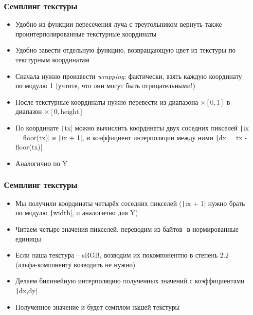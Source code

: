 \documentclass[10pt]{beamer}
\begin{document}
\begin{frame}
\frametitle{Семплинг текстуры}
\begin{itemize}
\item Удобно из функции пересечения луча с треугольником вернуть также проинтерполированные текстурные координаты
\pause
\item Удобно завести отдельную функцию, возвращающую цвет из текстуры по текстурным координатам
\pause
\item Сначала нужно произвести \textit{wrapping}: фактически, взять каждую координату по модулю 1 (учтите, что они могут быть отрицательными!)
\pause
\item После текстурные координаты нужно перевести из диапазона \begin{math}[0,1]\times [0,1]\end{math} в диапазон \begin{math}[0,\text{width}]\times[0,\text{height}]\end{math}
\pause
\item По координате \texttt|tx| можно вычислить координаты двух соседних пикселей \texttt|ix = floor(tx)| и \texttt|ix + 1|, и коэффициент интерполяции между ними \texttt|dx = tx - floor(tx)|
\pause
\item Аналогично по Y
\end{itemize}
\end{frame}

\begin{frame}
\frametitle{Семплинг текстуры}
\begin{itemize}
\item Мы получили координаты четырёх соседних пикселей (\texttt|ix + 1| нужно брать по модулю \texttt|width|, и аналогично для Y)
\pause
\item Читаем четыре значения пикселей, переводим из байтов \begin{math}[0,255]\end{math} в нормированные единицы \begin{math}[0,1]\end{math}
\pause
\item Если наша текстура -- sRGB, возводим их покомпонентно в степень \begin{math}2.2\end{math} (альфа-компоненту возводить не нужно)
\pause
\item Делаем билинейную интерполяцию полученных значений с коэффициентами \texttt|dx,dy|
\pause
\item Полученное значение и будет семплом нашей текстуры
\end{itemize}
\end{frame}
\end{document}
